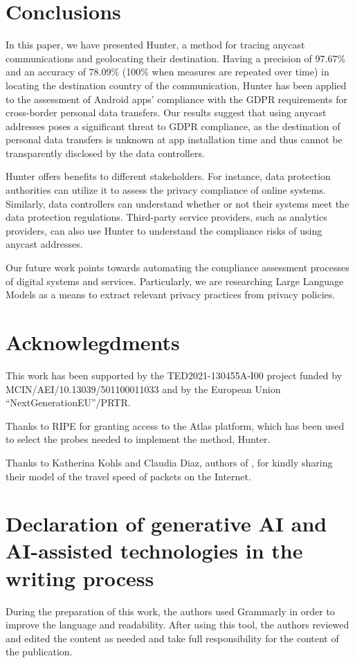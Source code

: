 \documentclass[preprint,12pt]{elsarticle}
\begin{document}
\section{Conclusions}
In this paper, we have presented Hunter, a method for tracing anycast communications and geolocating their destination. Having a precision of 97.67\% and an accuracy of 78.09\% (100\% when measures are repeated over time) in locating the destination country of the communication, Hunter has been applied to the assessment of Android apps' compliance with the GDPR requirements for cross-border personal data transfers. Our results suggest that using anycast addresses poses a significant threat to GDPR compliance, as the destination of personal data transfers is unknown at app installation time and thus cannot be transparently disclosed by the data controllers.

Hunter offers benefits to different stakeholders. For instance, data protection authorities can utilize it to assess the privacy compliance of online systems. Similarly, data controllers can understand whether or not their systems meet the data protection regulations. Third-party service providers, such as analytics providers, can also use Hunter to understand the compliance risks of using anycast addresses.

Our future work points towards automating the compliance assessment processes of digital systems and services. Particularly, we are researching Large Language Models as a means to extract relevant privacy practices from privacy policies.

\section{Acknowlegdments}
This work has been supported by the TED2021-130455A-I00 project funded by MCIN/AEI/10.13039/501100011033 and by the European Union “NextGenerationEU”/PRTR. 

Thanks to RIPE for granting access to the Atlas platform, which has been used to select the probes needed to implement the method, Hunter. 

Thanks to Katherina Kohls and Claudia Diaz, authors of \cite{Kohls2022VerLoc:Systems}, for kindly sharing their model of the travel speed of packets on the Internet.

\section{Declaration of generative AI and AI-assisted technologies in the writing process}
During the preparation of this work, the authors used Grammarly in order to improve the language and readability. After using this tool, the authors reviewed and edited the content as needed and take full responsibility for the content of the publication.
\end{document}
